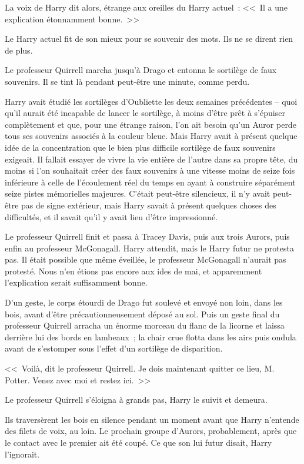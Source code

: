 La voix de Harry dit alors, étrange aux oreilles du Harry actuel~: <<~Il a une explication étonnamment bonne.~>>

Le Harry actuel fit de son mieux pour se souvenir des mots. Ils ne se dirent rien de plus.

Le professeur Quirrell marcha jusqu'à Drago et entonna le sortilège de faux souvenirs. Il se tint là pendant peut-être une minute, comme perdu.

Harry avait étudié les sortilèges d'Oubliette les deux semaines précédentes -- quoi qu'il aurait été incapable de lancer le sortilège, à moins d'être prêt à s'épuiser complètement et que, pour une étrange raison, l'on ait besoin qu'un Auror perde tous ses souvenirs associés à la couleur bleue. Mais Harry avait à présent quelque idée de la concentration que le bien plus difficile sortilège de faux souvenirs exigeait. Il fallait essayer de vivre la vie entière de l'autre dans sa propre tête, du moins si l'on souhaitait créer des faux souvenirs à une vitesse moins de seize fois inférieure à celle de l'écoulement réel du temps en ayant à construire séparément seize pistes mémorielles majeures. C'était peut-être silencieux, il n'y avait peut-être pas de signe extérieur, mais Harry savait à présent quelques choses des difficultés, et il savait qu'il y avait lieu d'être impressionné.

Le professeur Quirrell finit et passa à Tracey Davis, puis aux trois Aurors, puis enfin au professeur McGonagall. Harry attendit, mais le Harry futur ne protesta pas. Il était possible que même éveillée, le professeur McGonagall n'aurait pas protesté. Nous n'en étions pas encore aux ides de mai, et apparemment l'explication serait suffisamment bonne.

D'un geste, le corps étourdi de Drago fut soulevé et envoyé non loin, dans les bois, avant d'être précautionneusement déposé au sol. Puis un geste final du professeur Quirrell arracha un énorme morceau du flanc de la licorne et laissa derrière lui des bords en lambeaux~; la chair crue flotta dans les airs puis ondula avant de s'estomper sous l'effet d'un sortilège de disparition.

<<~Voilà, dit le professeur Quirrell. Je dois maintenant quitter ce lieu, M. Potter. Venez avec moi et restez ici.~>>

Le professeur Quirrell s'éloigna à grands pas, Harry le suivit et demeura.

Ils traversèrent les bois en silence pendant un moment avant que Harry n'entende des filets de voix, au loin. Le prochain groupe d'Aurors, probablement, après que le contact avec le premier ait été coupé. Ce que son lui futur disait, Harry l'ignorait.

